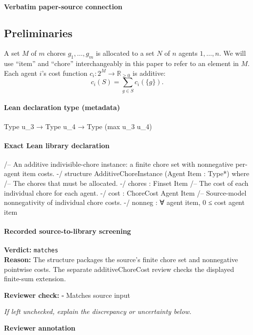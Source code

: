 \documentclass[10pt]{article}
\newcommand{\reviewerbox}{%
  \par\noindent\fbox{\parbox{0.96\linewidth}{\rule{0pt}{0.38in}}}\par
}
\newcommand{\reviewmatch}[1]{%
  \par\noindent\textbf{Reviewer check:} $\square$\; #1\par
  \noindent\emph{If left unchecked, explain the discrepancy or uncertainty below.}\par
}
\begin{document}
\paragraph{Verbatim paper-source connection}
\begin{ReviewVerbatim}
\section{Preliminaries}
A set $M$ of $m$ chores $g_1,\ldots,g_m$ is allocated to a set $N$ of $n$ agents $1,\ldots,n$.
We will use ``item'' and ``chore'' interchangeably in this paper to refer to an element in $M$.
Each agent $i$'s cost function $c_i:2^M\to\mathbb{R}_{\geq0}$ is additive:
$$c_i(S)=\sum_{g\in S}c_i(\{g\}).$$
\end{ReviewVerbatim}

\paragraph{Lean declaration type (metadata)}
\begin{ReviewVerbatim}
Type u_3 → Type u_4 → Type (max u_3 u_4)
\end{ReviewVerbatim}

\paragraph{Exact Lean library declaration}
\begin{ReviewVerbatim}
/-- An additive indivisible-chore instance: a finite chore set with nonnegative
per-agent item costs. -/
structure AdditiveChoreInstance (Agent Item : Type*) where
  /-- The chores that must be allocated. -/
  chores : Finset Item
  /-- The cost of each individual chore for each agent. -/
  cost : ChoreCost Agent Item
  /-- Source-model nonnegativity of individual chore costs. -/
  nonneg : ∀ agent item, 0 ≤ cost agent item
\end{ReviewVerbatim}

\paragraph{Recorded source-to-library screening}
\textbf{Verdict:} \texttt{matches}
\\
\textbf{Reason:} The structure packages the source's finite chore set and nonnegative pointwise costs. The separate additiveChoreCost review checks the displayed finite-sum extension.
\reviewmatch{Matches source input}
\noindent\textbf{Reviewer annotation}\par
\reviewerbox
\clearpage
\hypertarget{library-prerequisite-3240074e96589b21}{}
\end{document}
